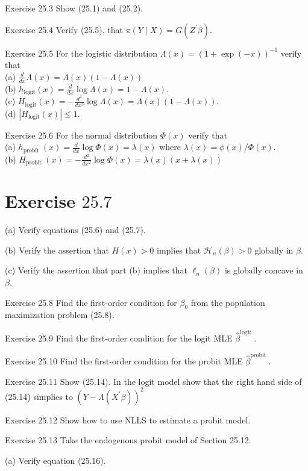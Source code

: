 \documentclass[10pt]{article}
\begin{document}
Exercise 25.3 Show (25.1) and (25.2).

Exercise 25.4 Verify (25.5), that $\pi(Y \mid X)=G\left(Z^{\prime} \beta\right)$.

Exercise 25.5 For the logistic distribution $\Lambda(x)=(1+\exp (-x))^{-1}$ verify that\\
(a) $\frac{d}{d x} \Lambda(x)=\Lambda(x)(1-\Lambda(x))$\\
(b) $h_{\operatorname{logit}}(x)=\frac{d}{d x} \log \Lambda(x)=1-\Lambda(x)$.\\
(c) $H_{\operatorname{logit}}(x)=-\frac{d^{2}}{d x^{2}} \log \Lambda(x)=\Lambda(x)(1-\Lambda(x))$.\\
(d) $\left|H_{\operatorname{logit}}(x)\right| \leq 1$.

Exercise 25.6 For the normal distribution $\Phi(x)$ verify that\\
(a) $h_{\text {probit }}(x)=\frac{d}{d x} \log \Phi(x)=\lambda(x)$ where $\lambda(x)=\phi(x) / \Phi(x)$.\\
(b) $H_{\text {probit }}(x)=-\frac{d^{2}}{d x^{2}} \log \Phi(x)=\lambda(x)(x+\lambda(x))$

\section{Exercise $25.7$}
(a) Verify equations (25.6) and (25.7).

(b) Verify the assertion that $H(x)>0$ implies that $\mathscr{H}_{n}(\beta)>0$ globally in $\beta$.

(c) Verify the assertion that part (b) implies that $\ell_{n}(\beta)$ is globally concave in $\beta$.

Exercise 25.8 Find the first-order condition for $\beta_{0}$ from the population maximization problem (25.8).

Exercise 25.9 Find the first-order condition for the logit MLE $\widehat{\beta}^{\text {logit }}$.

Exercise 25.10 Find the first-order condition for the probit MLE $\widehat{\beta}^{\text {probit }}$.

Exercise 25.11 Show (25.14). In the logit model show that the right hand side of (25.14) simplies to $\left(Y-\Lambda\left(X^{\prime} \beta\right)\right)^{2}$

Exercise 25.12 Show how to use NLLS to estimate a probit model.

Exercise 25.13 Take the endogenous probit model of Section 25.12.

(a) Verify equation (25.16).
\end{document}
